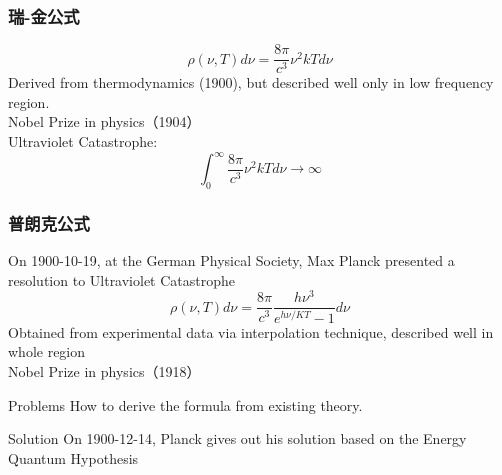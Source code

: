 \begin{frame}[t]
    \frametitle{瑞-金公式}
    \begin{equation*}
        \rho(\nu, T) d \nu=\frac{8 \pi}{c^{3}} \nu^{2} k T d \nu 
    \end{equation*}
    Derived from thermodynamics (1900), but described well only in low frequency region.\\ 
   {\color{deepred} Nobel Prize in physics（1904）}\\ \vspace{0.3em}
   {\color{deepblue} {\Bullet} Ultraviolet Catastrophe:} 
    \begin{equation*}
         \int_0 ^\infty \frac{8 \pi}{c^{3}} \nu^{2} k T d \nu \to \infty 
    \end{equation*}
\end{frame}

\begin{frame}
    \frametitle{普朗克公式}
    On 1900-10-19, at the German Physical Society, 
    Max Planck presented a resolution to {\color{deepblue} Ultraviolet Catastrophe} 
    \begin{equation}
        \boxed{\rho(\nu, T) d \nu=\frac{8 \pi}{c^{3}} \frac{h \nu^{3}}{e^{h \nu / K T}-1} d \nu}
    \end{equation}
    Obtained from experimental data via interpolation technique, described well in whole region \\
    {\color{deepred} Nobel Prize in physics（1918）}\\
\end{frame}

\begin{frame}
    \centering
    \begin{tcbb}[0.7]{Problems}{
        How to derive the formula from existing theory.}
    \end{tcbb}
\end{frame}

\begin{frame}
    \begin{tcolorbox2}{Solution}
        On 1900-12-14, Planck gives out his solution based on the Energy Quantum Hypothesis  
    \end{tcolorbox2}
\end{frame}


